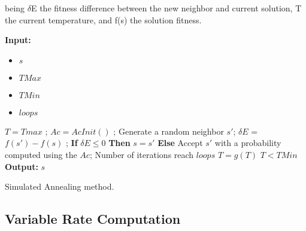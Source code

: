 being $\delta$E the fitness difference between the new neighbor and current solution, T the current temperature, and f(s) the solution fitness.
\\
\begin{algorithm}[t]
\textbf{Input:} 
\begin{itemize}
	\setlength{\itemsep}{1pt}
	\item $s$ 
	\item $TMax$ 
	\item $TMin$ 
	\item $loops$ 
\end{itemize}
\begin{algorithmic}
\State $T = Tmax$ ; 
\State $Ac = AcInit()$ ; 
\Repeat
	\Repeat	
		\State Generate a random neighbor $s'$;
		\State $\delta E$ = $f(s') - f(s)$ ;
		\State \textbf{If} $\delta E \leq 0$ \textbf{Then} $s = s'$ 
		\State \textbf{Else} Accept $s'$ with a probability computed using the $Ac$;
	\Until Number of iterations reach $loops$
	\State $T = g(T )$ 
\Until $T < TMin$
\State \textbf{Output:} $s$ 
\end{algorithmic}
\caption{Simulated Annealing method.}
\label{alg:SimulatedAnnealing}
\end{algorithm}

\subsection{Variable Rate Computation}

